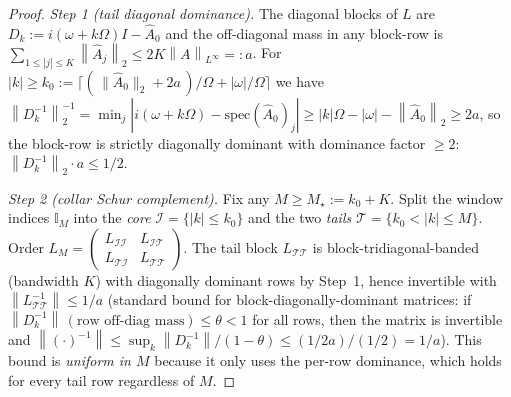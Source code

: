 \documentclass{amsart}
\theoremstyle{definition}
\newcommand{\norm}[1]{\left\lVert#1\right\rVert}
\begin{document}
\begin{proof}
\emph{Step 1 (tail diagonal dominance).} The diagonal blocks of $L$ are
$D_k:=i(\omega+k\Omega)I-\hat A_0$ and the off-diagonal mass in any block-row is
$\sum_{1\le|j|\le K}\norm{\hat A_j}_2\le 2K\norm{A}_{L^\infty}=:a$. For
$|k|\ge k_0:=\big\lceil(\,\|\hat A_0\|_2+2a\,)/\Omega+|\omega|/\Omega\big\rceil$ we
have $\norm{D_k^{-1}}_2^{-1}=\min_j|i(\omega+k\Omega)-\mathrm{spec}(\hat A_0)_j|
\ge |k|\Omega-|\omega|-\norm{\hat A_0}_2\ge 2a$, so the block-row is strictly
diagonally dominant with dominance factor $\ge 2$:
$\norm{D_k^{-1}}_2\cdot a\le 1/2$.

\emph{Step 2 (collar Schur complement).} Fix any $M\ge M_\star:=k_0+K$. Split the
window indices $\mathbb I_M$ into the \emph{core} $\mathcal I=\{|k|\le k_0\}$ and
the two \emph{tails} $\mathcal T=\{k_0<|k|\le M\}$. Order $L_M=\left(\begin{smallmatrix}
L_{\mathcal I\mathcal I}&L_{\mathcal I\mathcal T}\\ L_{\mathcal T\mathcal I}&
L_{\mathcal T\mathcal T}\end{smallmatrix}\right)$. The tail block $L_{\mathcal T\mathcal T}$
is block-tridiagonal-banded (bandwidth $K$) with diagonally dominant rows by
Step~1, hence invertible with $\norm{L_{\mathcal T\mathcal T}^{-1}}\le 1/a$
(standard bound for block-diagonally-dominant matrices: if
$\norm{D_k^{-1}}\,(\text{row off-diag mass})\le\theta<1$ for all rows, then the
matrix is invertible and $\norm{(\cdot)^{-1}}\le \sup_k\norm{D_k^{-1}}/(1-\theta)
\le (1/2a)/(1/2)=1/a$). This bound is \emph{uniform in $M$} because it only uses
the per-row dominance, which holds for every tail row regardless of $M$.


\end{proof}
\end{document}
